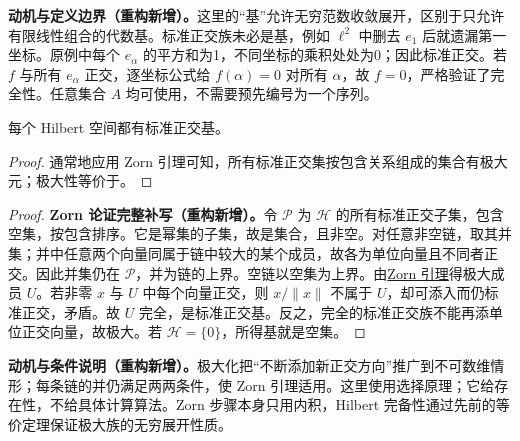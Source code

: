 \documentclass[../../main.tex]{subfiles}
\begin{document}
\begin{remark}
\textbf{动机与定义边界（重构新增）。}这里的“基”允许无穷范数收敛展开，区别于只允许有限线性组合的代数基。标准正交族未必是基，例如 $\ell^2$ 中删去 $e_1$ 后就遗漏第一坐标。原例中每个 $e_\alpha$ 的平方和为1，不同坐标的乘积处处为0；因此标准正交。若 $f$ 与所有 $e_\alpha$ 正交，逐坐标公式给 $f(\alpha)=0$ 对所有 $\alpha$，故 $f=0$，严格验证了完全性。任意集合 $A$ 均可使用，不需要预先编号为一个序列。
\end{remark}
\begin{proposition}\label{proposition:ch05-orthonormal-basis-existence}
每个 Hilbert 空间都有标准正交基。
\end{proposition}
\begin{proof}
通常地应用 Zorn 引理可知，所有标准正交集按包含关系组成的集合有极大元；极大性等价于。
\end{proof}
\begin{proof}
\textbf{Zorn 论证完整补写（重构新增）。}令 $\mathscr P$ 为 $\mathscr H$ 的所有标准正交子集，包含空集，按包含排序。它是幂集的子集，故是集合，且非空。对任意非空链，取其并集；并中任意两个向量同属于链中较大的某个成员，故各为单位向量且不同者正交。因此并集仍在 $\mathscr P$，并为链的上界。空链以空集为上界。由\hyperref[lemma:ch00-zorn]{Zorn 引理}得极大成员 $U$。若非零 $x$ 与 $U$ 中每个向量正交，则 $x/\|x\|$ 不属于 $U$，却可添入而仍标准正交，矛盾。故 $U$ 完全，是标准正交基。反之，完全的标准正交族不能再添单位正交向量，故极大。若 $\mathscr H=\{0\}$，所得基就是空集。
\end{proof}
\begin{remark}
\textbf{动机与条件说明（重构新增）。}极大化把“不断添加新正交方向”推广到不可数维情形；每条链的并仍满足两两条件，使 Zorn 引理适用。这里使用选择原理；它给存在性，不给具体计算算法。Zorn 步骤本身只用内积，Hilbert 完备性通过先前的等价定理保证极大族的无穷展开性质。
\end{remark}
\end{document}
